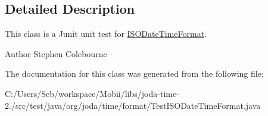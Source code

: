 \subsection{Detailed Description}
This class is a Junit unit test for \hyperlink{classorg_1_1joda_1_1time_1_1format_1_1_i_s_o_date_time_format}{I\-S\-O\-Date\-Time\-Format}.

\begin{DoxyAuthor}{Author}
Stephen Colebourne 
\end{DoxyAuthor}


The documentation for this class was generated from the following file\-:\begin{DoxyCompactItemize}
\item 
C\-:/\-Users/\-Seb/workspace/\-Mobii/libs/joda-\/time-\/2./src/test/java/org/joda/time/format/Test\-I\-S\-O\-Date\-Time\-Format.\-java\end{DoxyCompactItemize}

